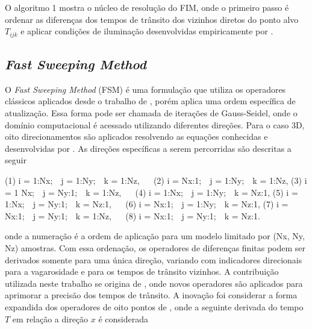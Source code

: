 O algoritmo 1 mostra o núcleo de resolução do FIM, onde o primeiro passo é ordenar as diferenças dos tempos de trânsito dos vizinhos diretos do ponto alvo $T_{ijk}$ e aplicar condições de iluminação desenvolvidas empiricamente por . 

\subsection{\textit{Fast Sweeping Method}}

O \textit{Fast Sweeping Method} (FSM) \cite{zhao2005fast} é uma formulação que utiliza os operadores clássicos aplicados desde o trabalho de , porém aplica uma ordem específica de atualização. Essa forma pode ser chamada de iterações de Gauss-Seidel, onde o domínio computacional é acessado utilizando diferentes direções. Para o caso 3D, oito direcionamentos são aplicados resolvendo as equações conhecidas e desenvolvidas por . As direções específicas a serem percorridas são descritas a seguir
\begin{center}
\noindent (1) i = 1:Nx;$\,\,\,\,$ j = 1:Ny;$\,\,\,\,$ k = 1:Nz,$\,\,\,\,\,\,\,\,$ (2) i = Nx:1;$\,\,\,\,$ j = 1:Ny;$\,\,\,\,$ k = 1:Nz, \newline 
\noindent (3) i = 1 Nx;$\,\,\,\,$ j = Ny:1;$\,\,\,\,$ k = 1:Nz,$\,\,\,\,\,\,\,\,$ (4) i = 1:Nx;$\,\,\,\,$ j = 1:Ny;$\,\,\,\,$ k = Nz:1, \newline
\noindent (5) i = 1:Nx;$\,\,\,\,$ j = Ny:1;$\,\,\,\,$ k = Nz:1,$\,\,\,\,\,\,\,\,$ (6) i = Nx:1;$\,\,\,\,$ j = 1:Ny;$\,\,\,\,$ k = Nz:1, \newline 
\noindent (7) i = Nx:1;$\,\,\,\,$ j = Ny:1;$\,\,\,\,$ k = 1:Nz,$\,\,\,\,\,\,\,\,$ (8) i = Nx:1;$\,\,\,\,$ j = Ny:1;$\,\,\,\,$ k = Nz:1. $\,\,\,\,\,\,\,\,\,\,\,\,\,$
\end{center}
\noindent onde a numeração é a ordem de aplicação para um modelo limitado por (Nx, Ny, Nz) amostras. Com essa ordenação, os operadores de diferenças finitas podem ser derivados somente para uma única direção, variando com indicadores direcionais para a vagarosidade e para os tempos de trânsito vizinhos. A contribuição utilizada neste trabalho se origina de , onde novos operadores são aplicados para aprimorar a precisão dos tempos de trânsito. A inovação foi considerar a forma expandida dos operadores de oito pontos de , onde a seguinte derivada do tempo $T$ em relação a direção $x$ é considerada    
